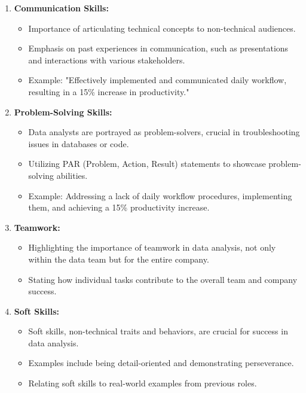 \documentclass[]{article}
\begin{document}
\begin{enumerate}
  \item \textbf{Communication Skills:}
        \begin{itemize}
          \item Importance of articulating technical concepts to non-technical audiences.
          \item Emphasis on past experiences in communication, such as presentations and interactions with various stakeholders.
          \item Example: "Effectively implemented and communicated daily workflow, resulting in a 15\% increase in productivity."
        \end{itemize}

  \item \textbf{Problem-Solving Skills:}
        \begin{itemize}
          \item Data analysts are portrayed as problem-solvers, crucial in troubleshooting issues in databases or code.
          \item Utilizing PAR (Problem, Action, Result) statements to showcase problem-solving abilities.
          \item Example: Addressing a lack of daily workflow procedures, implementing them, and achieving a 15\% productivity increase.
        \end{itemize}

  \item \textbf{Teamwork:}
        \begin{itemize}
          \item Highlighting the importance of teamwork in data analysis, not only within the data team but for the entire company.
          \item Stating how individual tasks contribute to the overall team and company success.
        \end{itemize}

  \item \textbf{Soft Skills:}
        \begin{itemize}
          \item Soft skills, non-technical traits and behaviors, are crucial for success in data analysis.
          \item Examples include being detail-oriented and demonstrating perseverance.
          \item Relating soft skills to real-world examples from previous roles.
        \end{itemize}
\end{enumerate}
\end{document}
